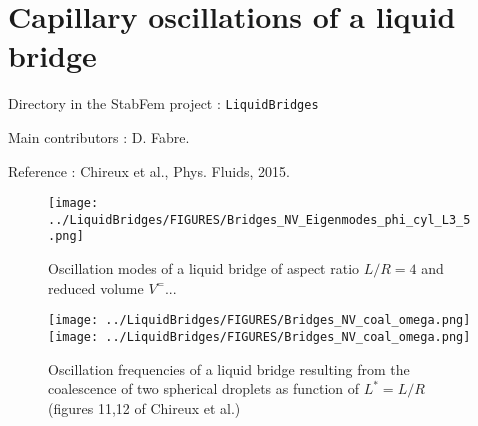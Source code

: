 
\chapter{Capillary oscillations of a liquid bridge}

\begin{description}
\item{Directory in the StabFem project :}  \texttt{LiquidBridges}
\item{Main contributors :} D. Fabre.
\item{Reference :} Chireux et al., Phys. Fluids, 2015.
\end{description}


\begin{figure}
\texttt{[image: ../LiquidBridges/FIGURES/Bridges\_NV\_Eigenmodes\_phi\_cyl\_L3\_5.png]}
\caption{Oscillation modes of a liquid bridge of aspect ratio $L/R=4$ and reduced volume $V^ =$...}
\label{Bridges_NV_Eigenmodes_phi_cyl_L3_5}
\end{figure}

\begin{figure}
\texttt{[image: ../LiquidBridges/FIGURES/Bridges\_NV\_coal\_omega.png]}
\texttt{[image: ../LiquidBridges/FIGURES/Bridges\_NV\_coal\_omega.png]}
\caption{Oscillation frequencies of a liquid bridge resulting from the coalescence of two spherical droplets
as function of $L^* =L/R$
(figures 11,12 of Chireux et al.)
}
\label{Bridges_NV_Eigenmodes_phi_cyl_L3_5}
\end{figure}
 